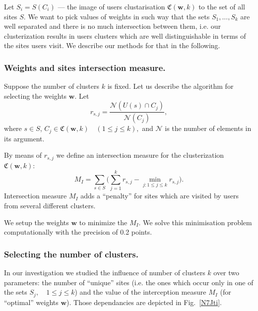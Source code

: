 \documentclass[runningheads,a4paper]{llncs}
\begin{document}
Let $S_i = S(C_i)$ --- the image of users clustarisation $\mathfrak{C}(\boldsymbol{w}, k)$ to the set of all sites $S$. We want to pick values of weights in such way that the sets $S_1, ..., S_k$ are well separated and there is no much intersection between them, i.e. our clusterization results in users clusters which are well distinguishable in terms of the sites users visit. We describe our methods for that in the following.



\subsubsection{Weights and sites intersection measure.}

Suppose the number of clusters $k$ is fixed. Let us describe the algorithm for selecting the weights $\boldsymbol{w}$. Let
\[
	r_{s,j} = \frac{\mathcal{N}(U(s) \cap C_j)}{\mathcal{N}(C_j)},
\]
where $s \in S$, $C_j \in \mathfrak{C}(\boldsymbol{w}, k) \quad (1 \leq j \leq k ),$ and $\mathcal{N}$ is the number of elements in its argument.

By means of $r_{s,j}$ we define an intersection measure for the clusterization $\mathfrak{C}(\boldsymbol{w}, k)$:
\[
	M_I = \sum_{s \in S} \Big( \sum_{j=1}^{k} r_{s,j} - \min_{j\colon 1 \leq j \leq k} r_{s,j} \Big).
\]
Intersection measure $M_I$ adds a ``penalty'' for sites which are visited by users from several different clusters.

We setup the weights $\boldsymbol{w}$ to minimize the $M_I$. We solve this minimisation problem computationally with the precision of 0.2 points.



\subsubsection{Selecting the number of clusters.}

In our investigation we studied the influence of number of clusters $k$ over two parameters: the number of ``unique'' sites (i.e. the ones which occur only in one of the sets $S_j, \quad 1 \leq j \leq k$) and the value of the interception measure $M_I$ (for ``optimal'' weights $\boldsymbol{w}$). Those dependancies are depicted in Fig.~\ref{N7Jti}.
\end{document}
